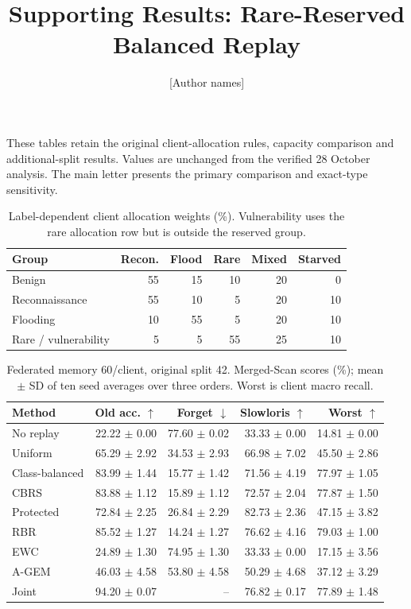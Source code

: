 \documentclass[10pt]{article}
\title{\large Supporting Results: Rare-Reserved Balanced Replay}
\author{[Author names]}\date{}
\begin{document}
\maketitle
\noindent These tables retain the original client-allocation rules, capacity comparison and additional-split results. Values are unchanged from the verified 28 October analysis. The main letter presents the primary comparison and exact-type sensitivity.
\begin{table}[!ht]
\centering
\caption{Label-dependent client allocation weights (\%). Vulnerability uses the rare allocation row but is outside the reserved group.}
\label{tab:allocation}
\footnotesize
\begin{tabular}{lrrrrr}
\toprule
Group & Recon. & Flood & Rare & Mixed & Starved\\
\midrule
Benign &55&15&10&20&0\\
Reconnaissance &55&10&5&20&10\\
Flooding &10&55&5&20&10\\
Rare / vulnerability &5&5&55&25&10\\
\bottomrule
\end{tabular}
\end{table}
\begin{table}[!ht]
\centering
\caption{Federated memory 60/client, original split 42. Merged-Scan scores (\%); mean $\pm$ SD of ten seed averages over three orders. Worst is client macro recall.}
\label{tab:main}
\footnotesize
\setlength{\tabcolsep}{2.5pt}
\begin{tabular}{lrrrr}
\toprule
Method & Old acc. $\uparrow$ & Forget $\downarrow$ & Slowloris $\uparrow$ & Worst $\uparrow$\\
\midrule
No replay & 22.22 $\pm$ 0.00 & 77.60 $\pm$ 0.02 & 33.33 $\pm$ 0.00 & 14.81 $\pm$ 0.00\\
Uniform & 65.29 $\pm$ 2.92 & 34.53 $\pm$ 2.93 & 66.98 $\pm$ 7.02 & 45.50 $\pm$ 2.86\\
Class-balanced & 83.99 $\pm$ 1.44 & 15.77 $\pm$ 1.42 & 71.56 $\pm$ 4.19 & 77.97 $\pm$ 1.05\\
CBRS & 83.88 $\pm$ 1.12 & 15.89 $\pm$ 1.12 & 72.57 $\pm$ 2.04 & 77.87 $\pm$ 1.50\\
Protected & 72.84 $\pm$ 2.25 & 26.84 $\pm$ 2.29 & 82.73 $\pm$ 2.36 & 47.15 $\pm$ 3.82\\
RBR & 85.52 $\pm$ 1.27 & 14.24 $\pm$ 1.27 & 76.62 $\pm$ 4.16 & 79.03 $\pm$ 1.00\\
EWC & 24.89 $\pm$ 1.30 & 74.95 $\pm$ 1.30 & 33.33 $\pm$ 0.00 & 17.15 $\pm$ 3.56\\
A-GEM & 46.03 $\pm$ 4.58 & 53.80 $\pm$ 4.58 & 50.29 $\pm$ 4.68 & 37.12 $\pm$ 3.29\\
Joint & 94.20 $\pm$ 0.07 & -- & 76.82 $\pm$ 0.17 & 77.89 $\pm$ 1.48\\
\bottomrule
\end{tabular}
\end{table}
\end{document}
